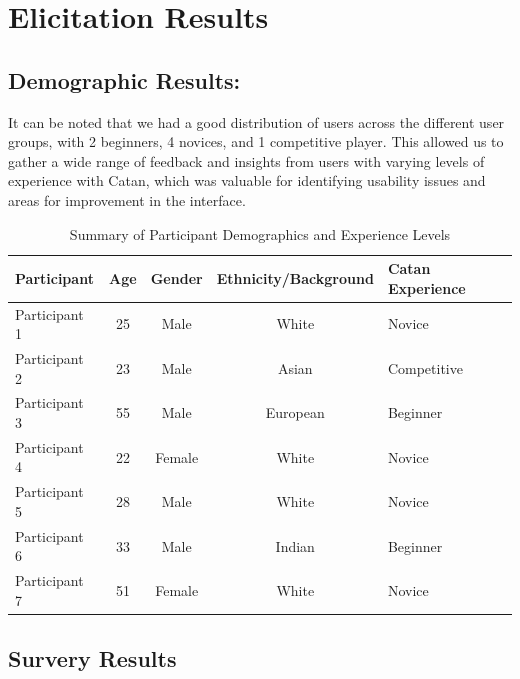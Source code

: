 \documentclass[12pt]{article}
\begin{document}
\section{Elicitation Results}

\subsection{Demographic Results:}
It can be noted that we had a good distribution of users across the different user groups, with 2 beginners, 4 novices, and 1 competitive player. This allowed us to gather a wide range of feedback and insights from users with varying levels of experience with Catan, which was valuable for identifying usability issues and areas for improvement in the interface.

\begin{table}[H]
    \centering
    \small
    \begin{tabular}{@{}lcccl@{}}
    \toprule
    \textbf{Participant} & \textbf{Age} & \textbf{Gender} & \textbf{Ethnicity/Background} & \textbf{Catan Experience} \\ \midrule
    Participant 1        & 25           & Male            & White                     & Novice                    \\
    Participant 2        & 23           & Male            & Asian                     & Competitive               \\
    Participant 3        & 55           & Male            & European                  & Beginner                  \\
    Participant 4        & 22           & Female          & White                     & Novice                    \\
    Participant 5        & 28           & Male            & White                     & Novice                    \\
    Participant 6        & 33           & Male            & Indian                    & Beginner                  \\
    Participant 7        & 51           & Female          & White                     & Novice                    \\ \bottomrule
    \end{tabular}
    \caption{Summary of Participant Demographics and Experience Levels}
    \label{tab:demographics}
\end{table}

\subsection{Survery Results}
\end{document}
